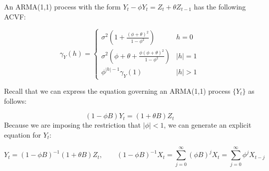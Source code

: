 An ARMA(1,1) process with the form $Y_t - \phi Y_t = Z_t + \theta Z_{t-1}$ has the following ACVF:

\begin{equation}
    \label{eq:acvf_arma}
    \gamma_Y(h) = \begin{cases}
        \sigma^2(1 + \frac{(\phi + \theta)^2}{1 - \phi ^ 2}) & h = 0 \\
        \sigma^2(\phi + \theta + \frac{\phi(\phi + \theta)^2}{1 - \phi ^ 2}) & |h| = 1 \\
        \phi^{|h|-1}\gamma_Y(1) & |h| > 1
    \end{cases}
\end{equation}

Recall that we can express the equation governing an ARMA(1,1) process $\{Y_t\}$ as follows:

$$ (1 -\phi B)Y_t = (1 + \theta B)Z_t $$
Because we are imposing the restriction that $|\phi|<1$, we can generate an explicit equation for $Y_t$:

$$ Y_t = (1 - \phi B)^{-1}(1 + \theta B)Z_t, \qquad (1-\phi B)^{-1}X_t = \sum_{j=0}^\infty (\phi B)^jX_{t} = \sum_{j=0}^\infty \phi^jX_{t-j} $$

